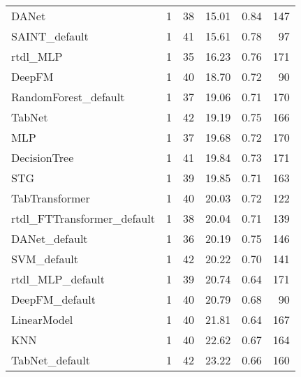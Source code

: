 \begin{tabular}{lrrrrr}
DANet                      &                  1 &  38 &  15.01 &                           0.84 &   147 \\
SAINT_default              &                  1 &  41 &  15.61 &                           0.78 &    97 \\
rtdl_MLP                   &                  1 &  35 &  16.23 &                           0.76 &   171 \\
DeepFM                     &                  1 &  40 &  18.70 &                           0.72 &    90 \\
RandomForest_default       &                  1 &  37 &  19.06 &                           0.71 &   170 \\
TabNet                     &                  1 &  42 &  19.19 &                           0.75 &   166 \\
MLP                        &                  1 &  37 &  19.68 &                           0.72 &   170 \\
DecisionTree               &                  1 &  41 &  19.84 &                           0.73 &   171 \\
STG                        &                  1 &  39 &  19.85 &                           0.71 &   163 \\
TabTransformer             &                  1 &  40 &  20.03 &                           0.72 &   122 \\
rtdl_FTTransformer_default &                  1 &  38 &  20.04 &                           0.71 &   139 \\
DANet_default              &                  1 &  36 &  20.19 &                           0.75 &   146 \\
SVM_default                &                  1 &  42 &  20.22 &                           0.70 &   141 \\
rtdl_MLP_default           &                  1 &  39 &  20.74 &                           0.64 &   171 \\
DeepFM_default             &                  1 &  40 &  20.79 &                           0.68 &    90 \\
LinearModel                &                  1 &  40 &  21.81 &                           0.64 &   167 \\
KNN                        &                  1 &  40 &  22.62 &                           0.67 &   164 \\
TabNet_default             &                  1 &  42 &  23.22 &                           0.66 &   160 \\

\end{tabular}
